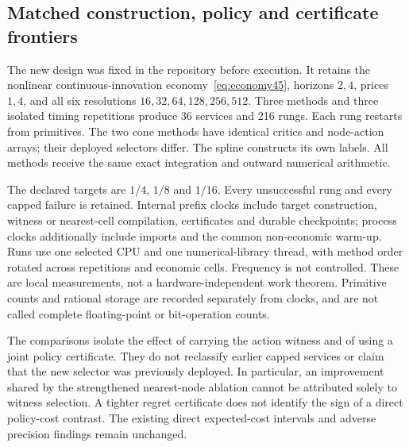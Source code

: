\subsection{Matched construction, policy and certificate frontiers}\label{sec:study46}
The new design was fixed in the repository before execution. It retains the nonlinear continuous-innovation economy~\eqref{eq:economy45}, horizons $2,4$, prices $1,4$, and all six resolutions $16,32,64,128,256,512$. Three methods and three isolated timing repetitions produce 36 services and 216 rungs. Each rung restarts from primitives. The two cone methods have identical critics and node-action arrays; their deployed selectors differ. The spline constructs its own labels. All methods receive the same exact integration and outward numerical arithmetic.

The declared targets are $1/4$, $1/8$ and $1/16$. Every unsuccessful rung and every capped failure is retained. Internal prefix clocks include target construction, witness or nearest-cell compilation, certificates and durable checkpoints; process clocks additionally include imports and the common non-economic warm-up. Runs use one selected CPU and one numerical-library thread, with method order rotated across repetitions and economic cells. Frequency is not controlled. These are local measurements, not a hardware-independent work theorem. Primitive counts and rational storage are recorded separately from clocks, and are not called complete floating-point or bit-operation counts.



The comparisons isolate the effect of carrying the action witness and of using a joint policy certificate. They do not reclassify earlier capped services or claim that the new selector was previously deployed. In particular, an improvement shared by the strengthened nearest-node ablation cannot be attributed solely to witness selection. A tighter regret certificate does not identify the sign of a direct policy-cost contrast. The existing direct expected-cost intervals and adverse precision findings remain unchanged.
